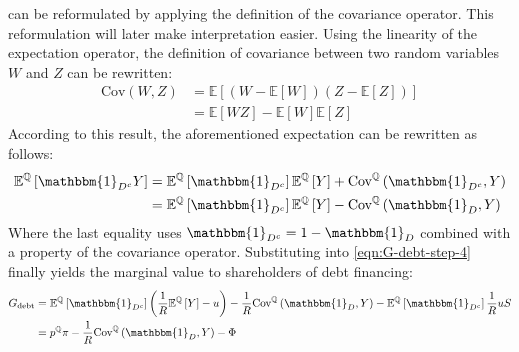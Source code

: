 \documentclass[../main.tex]{subfiles}
\begin{document}
        can be reformulated by applying the definition of the covariance operator.
        This reformulation will later make interpretation easier.
        Using the linearity of the expectation operator,
        the definition of covariance between two random variables $W$ and $Z$ can be rewritten:
            \begin{align}
                \text{Cov}\left(W, Z\right) &= 
                \mathbb{E}\left[
                    (W - \mathbb{E}\left[W\right])
                    (Z - \mathbb{E}\left[Z\right])
                \right] \nonumber\\
                &=
                \mathbb{E}\left[WZ\right]
                - \mathbb{E}\left[W\right] \mathbb{E}\left[Z\right] \nonumber
            \end{align}
        According to this result, the aforementioned expectation can be rewritten as follows:
            \begin{align}
                \mathbb{E}^{\mathbb{Q}}\left[
                    \mathbbm{1}_{D^{c}}Y
                \right]
                &=
                \mathbb{E}^{\mathbb{Q}}\left[\mathbbm{1}_{D^{c}}\right] 
                \mathbb{E}^{\mathbb{Q}}\left[Y\right] 
                + 
                \text{Cov}^{\mathbb{Q}}\left(\mathbbm{1}_{D^{c}}, Y\right) 
                \nonumber\\
                &=
                \mathbb{E}^{\mathbb{Q}}\left[\mathbbm{1}_{D^{c}}\right] 
                \mathbb{E}^{\mathbb{Q}}\left[Y\right] 
                - 
                \text{Cov}^{\mathbb{Q}}\left(\mathbbm{1}_{D}, Y\right) 
            \end{align}
        Where the last equality uses $\mathbbm{1}_{D^{c}} = 1 - \mathbbm{1}_{D}$ 
        combined with a property of the covariance operator.
        Substituting into \cref{eqn:G-debt-step-4} finally yields the marginal value to shareholders of debt financing:
            \begin{align}
                G_{\text{debt}} &=
                \mathbb{E}^{\mathbb{Q}}\left[\mathbbm{1}_{D^{c}}\right] 
                \left(
                    \discountfactor
                    \mathbb{E}^{\mathbb{Q}}\left[Y\right] 
                    - u
                \right)
                -
                \discountfactor
                \text{Cov}^{\mathbb{Q}}\left(\mathbbm{1}_{D}, Y\right) 
                - 
                \mathbb{E}^{\mathbb{Q}}\left[
                    \mathbbm{1}_{D^{c}}
                \right] \discountfactor u S
                \nonumber \\
                &= 
                p^{\mathbb{Q}} \pi 
                - \discountfactor 
                \text{Cov}^{\mathbb{Q}}\left(
                    \mathbbm{1}_{D}, 
                    Y
                \right) 
                - \Phi
                \label{eqn:marginal-shareholder-value-debt-financing}
            \end{align}
\end{document}
